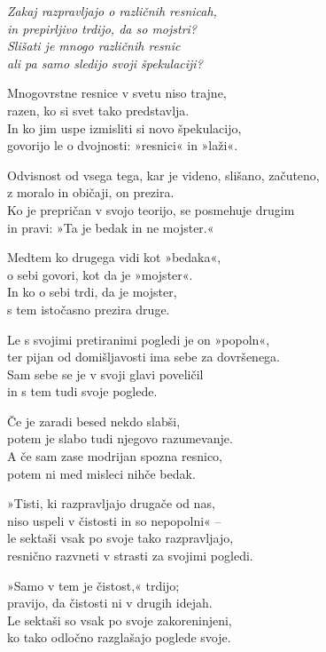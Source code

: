 \emph{Zakaj razpravljajo o različnih resnicah,\\
in prepirljivo trdijo, da so mojstri?\\
Slišati je mnogo različnih resnic\\
ali pa samo sledijo svoji špekulaciji?}

Mnogovrstne resnice v svetu niso trajne,\\
razen, ko si svet tako predstavlja.\\
In ko jim uspe izmisliti si novo špekulacijo,\\
govorijo le o dvojnosti: »resnici« in »laži«.

\clearpage

Odvisnost od vsega tega, kar je videno, slišano, začuteno,\\
z moralo in običaji, on prezira.\\
Ko je prepričan v svojo teorijo, se posmehuje drugim\\
in pravi: »Ta je bedak in ne mojster.«

Medtem ko drugega vidi kot »bedaka«,\\
o sebi govori, kot da je »mojster«.\\
In ko o sebi trdi, da je mojster,\\
s tem istočasno prezira druge.

Le s svojimi pretiranimi pogledi je on »popoln«,\\
ter pijan od domišljavosti ima sebe za dovršenega.\\
Sam sebe se je v svoji glavi poveličil\\
in s tem tudi svoje poglede.

Če je zaradi besed nekdo slabši,\\
potem je slabo tudi njegovo razumevanje.\\
A če sam zase modrijan spozna resnico,\\
potem ni med misleci nihče bedak.

»Tisti, ki razpravljajo drugače od nas,\\
niso uspeli v čistosti in so nepopolni« --\\
le sektaši vsak po svoje tako razpravljajo,\\
resnično razvneti v strasti za svojimi pogledi.

\clearpage

»Samo v tem je čistost,« trdijo;\\
pravijo, da čistosti ni v drugih idejah.\\
Le sektaši so vsak po svoje zakoreninjeni,\\
ko tako odločno razglašajo poglede svoje.

